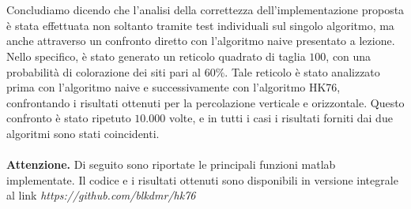 \\\\
\noindent
Concludiamo dicendo che l'analisi della correttezza dell'implementazione proposta è stata effettuata non soltanto tramite test individuali sul singolo algoritmo, ma anche attraverso un confronto diretto con l'algoritmo naive presentato a lezione. Nello specifico, è stato generato un reticolo quadrato di taglia $100$, con una probabilità di colorazione dei siti pari al $60\%$. Tale reticolo è stato analizzato prima con l'algoritmo naive e successivamente con l'algoritmo HK76, confrontando i risultati ottenuti per la percolazione verticale e orizzontale. Questo confronto è stato ripetuto $10.000$ volte, e in tutti i casi i risultati forniti dai due algoritmi sono stati coincidenti. 
\\\\
\noindent
\textbf{Attenzione.} Di seguito sono riportate le principali funzioni matlab implementate. Il codice e i risultati ottenuti sono disponibili in versione integrale al link \textit{https://github.com/blkdmr/hk76}

